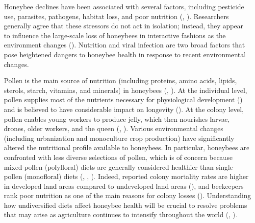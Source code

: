 \documentclass[11pt,a4paper,oldfontcommands,openany]{memoir}
\numberwithin{equation}{section} %
\begin{document}
Honeybee declines have been associated with several factors, including pesticide use, parasites, pathogens, habitat loss, and poor nutrition (\citealt{factors}, \citealt{factors2}). Researchers generally agree that these stressors do not act in isolation; instead, they appear to influence the large-scale loss of honeybees in interactive fashions as the environment changes (\citealt{interacting}). Nutrition and viral infection are two broad factors that pose heightened dangers to honeybee health in response to recent environmental changes.

Pollen is the main source of nutrition (including proteins, amino acids, lipids, sterols, starch, vitamins, and minerals) in honeybees (\citealt{source}, \citealt{source2}). At the individual level, pollen supplies most of the nutrients necessary for physiological development (\citealt{brodschneider}) and is believed to have considerable impact on longevity (\citealt{longevity}). At the colony level, pollen enables young workers to produce jelly, which then nourishes larvae, drones, older workers, and the queen (\citealt{jelly}, \citealt{jelly2}). Various environmental changes (including urbanization and monoculture crop production) have significantly altered the nutritional profile available to honeybees. In particular, honeybees are confronted with less diverse selections of pollen, which is of concern because mixed-pollen (polyfloral) diets are generally considered healthier than single-pollen (monofloral) diets (\citealt{diverse}, \citealt{diverse2}, \citealt{diverse3}). Indeed, reported colony mortality rates are higher in developed land areas compared to undeveloped land areas (\citealt{undeveloped}), and beekeepers rank poor nutrition as one of the main reasons for colony losses (\citealt{bkLoss}). Understanding how undiversified diets affect honeybee health will be crucial to resolve problems that may arise as agriculture continues to intensify throughout the world (\citealt{ag}, \citealt{ag2}).
\end{document}
